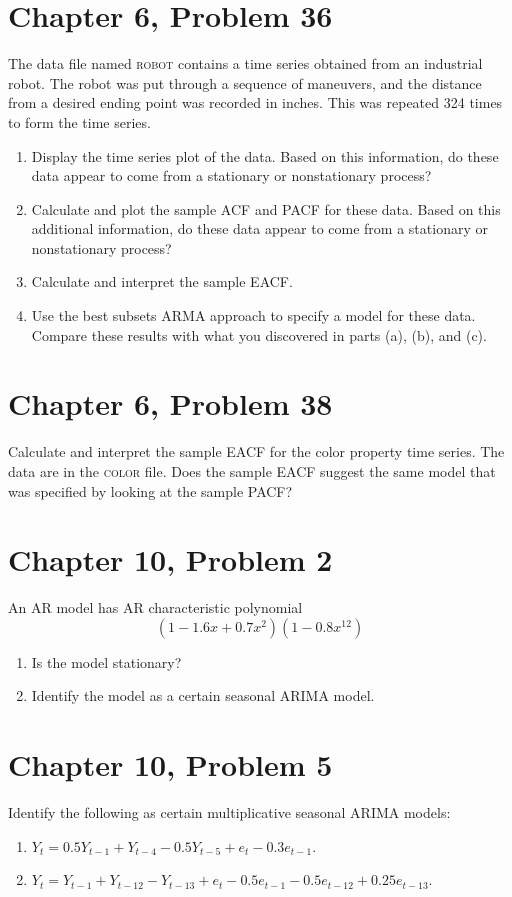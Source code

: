\documentclass[11pt]{article}
\newif\ifclearpage
\newcommand{\problem}[1]{\section*{#1}}
\newcommand{\solution}{\hrulefill}
\newcommand{\maybeclearpage}{\ifclearpage\clearpage\fi}
\begin{document}
\maybeclearpage
\problem{Chapter 6, Problem 36}
The data file named \textsc{robot} contains a time series obtained from an industrial robot. The robot was put through a sequence of maneuvers, and the distance from a desired ending point was recorded in inches. This was repeated 324 times to form the time series.
\begin{enumerate}
\item Display the time series plot of the data. Based on this information, do these data appear to come from a stationary or nonstationary process?
\item Calculate and plot the sample ACF and PACF for these data. Based on this additional information, do these data appear to come from a stationary or nonstationary process?
\item Calculate and interpret the sample EACF.
\item Use the best subsets ARMA approach to specify a model for these data. Compare these results with what you discovered in parts (a), (b), and (c).
\end{enumerate}

\solution

\maybeclearpage
\problem{Chapter 6, Problem 38}
Calculate and interpret the sample EACF for the color property time series. The data are in the \textsc{color} file. Does the sample EACF suggest the same model that was specified by looking at the sample PACF?

\solution


\maybeclearpage
\problem{Chapter 10, Problem 2}
An AR model has AR characteristic polynomial $$(1 - 1.6x + 0.7x^2)(1 - 0.8x^{12})$$
\begin{enumerate}
	\item Is the model stationary?
	\item Identify the model as a certain seasonal ARIMA model.
\end{enumerate}

\solution


\maybeclearpage
\problem{Chapter 10, Problem 5}
Identify the following as certain multiplicative seasonal ARIMA models:
\begin{enumerate}
	\item $Y_t = 0.5Y_{t-1} + Y_{t-4} - 0.5Y_{t-5} + e_t - 0.3e_{t-1}$.
	\item $Y_t = Y_{t-1} + Y_{t-12} - Y_{t-13} + e_t - 0.5e_{t-1} - 0.5e_{t-12} + 0.25e_{t-13}$.
\end{enumerate}

\solution

\maybeclearpage
\end{document}
